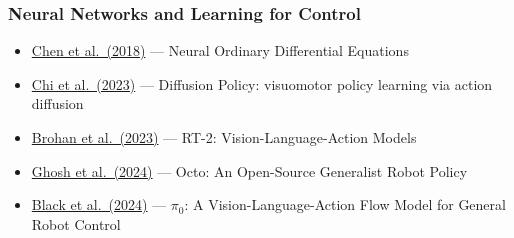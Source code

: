 \subsubsection*{Neural Networks and Learning for Control}
\begin{itemize}[nosep]
    \item \href{https://arxiv.org/abs/1806.07366}{Chen et al.\ (2018)} --- Neural Ordinary Differential Equations
    \item \href{https://arxiv.org/abs/2303.04137}{Chi et al.\ (2023)} --- Diffusion Policy: visuomotor policy learning via action diffusion
    \item \href{https://arxiv.org/abs/2307.15818}{Brohan et al.\ (2023)} --- RT-2: Vision-Language-Action Models
    \item \href{https://arxiv.org/abs/2405.12213}{Ghosh et al.\ (2024)} --- Octo: An Open-Source Generalist Robot Policy
    \item \href{https://arxiv.org/abs/2410.24164}{Black et al.\ (2024)} --- $\pi_0$: A Vision-Language-Action Flow Model for General Robot Control
\end{itemize}

